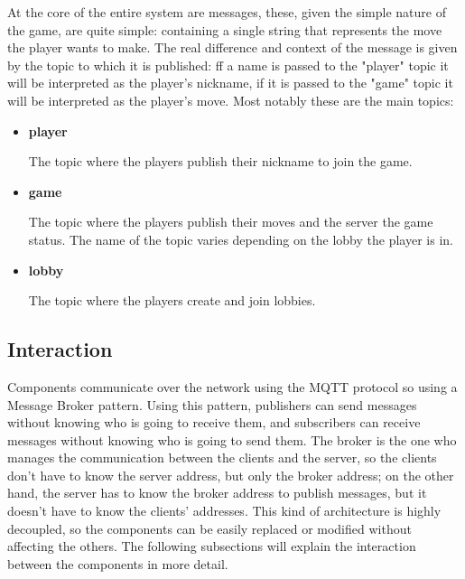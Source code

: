 \documentclass{scrartcl}
\begin{document}
At the core of the entire system are messages, these, given the simple nature of the game, are quite 
simple: containing a single string that represents the move the player wants to make. \newline
The real difference and context of the message is given by the topic to which it is published: 
ff a name is passed to the "player" topic it will be interpreted as the player's nickname,
if it is passed to the "game" topic it will be interpreted as the player's move. \newline
Most notably these are the main topics:
\begin{itemize}
  \item \textbf{player} \par
  The topic where the players publish their nickname to join the game.
  \item \textbf{game} \par
  The topic where the players publish their moves and the server the game status. \newline
  The name of the topic varies depending on the lobby the player is in.
  \item \textbf{lobby} \par
  The topic where the players create and join lobbies.
\end{itemize}

\subsection{Interaction}\label{interaction}

Components communicate over the network using the MQTT protocol so using a Message Broker pattern. Using this pattern, publishers can send messages without knowing who is going to receive them, and subscribers can receive messages without knowing who is going to send them. 
The broker is the one who manages the communication between the clients and the server, so the clients don't have to know the server address, but only the broker address; on the other hand, the server has to know the broker address to publish messages, but it doesn't have to know the clients' addresses. \newline
This kind of architecture is highly decoupled, so the components can be easily replaced or modified without affecting the others. \newline
The following subsections will explain the interaction between the components in more detail.
\end{document}
